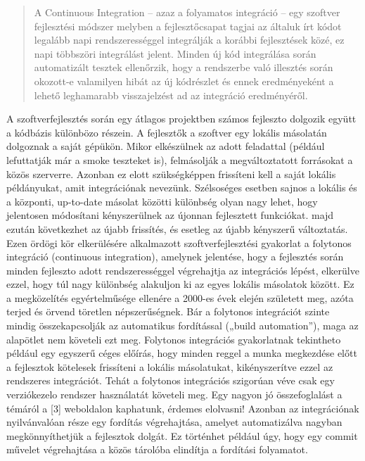\begin{quotation}
A Continuous Integration – azaz a folyamatos integráció – egy szoftver fejlesztési módszer melyben a fejlesztőcsapat tagjai az általuk írt kódot legalább napi rendszerességgel integrálják a korábbi fejlesztések közé, ez napi többszöri integrálást jelent. Minden új kód integrálása során automatizált tesztek ellenőrzik, hogy a rendszerbe való illesztés során okozott-e valamilyen hibát az új kódrészlet és ennek eredményeként a lehető leghamarabb visszajelzést ad az integráció eredményéről. \cite{martin_fowler_cont_int}
\end{quotation} 

A szoftverfejlesztés során egy átlagos projektben számos fejleszto dolgozik együtt a kódbázis különbözo részein. A fejlesztők a szoftver egy lokális másolatán dolgoznak a saját gépükön. Mikor elkészülnek az adott feladattal (például lefuttatják már a smoke teszteket is), felmásolják
a megváltoztatott forrásokat a közös szerverre. Azonban ez elott szükségképpen frissíteni kell a saját lokális példányukat, amit integrációnak nevezünk. Szélsoséges esetben sajnos a lokális és a központi, up-to-date másolat közötti különbség olyan nagy lehet, hogy jelentosen módosítani kényszerülnek az újonnan fejlesztett funkciókat. majd ezután következhet az újabb frissítés, és esetleg az újabb kényszerű változtatás. Ezen ördögi kör elkerülésére alkalmazott szoftverfejlesztési gyakorlat a folytonos integráció (continuous integration), amelynek jelentése, hogy a fejlesztés során minden fejleszto adott rendszerességgel végrehajtja az integrációs lépést, elkerülve ezzel, hogy túl nagy különbség alakuljon ki az egyes lokális másolatok között. Ez a megközelítés egyértelműsége ellenére a 2000-es évek elején született meg, azóta terjed és örvend töretlen népszerűségnek. Bár a folytonos integrációt szinte mindig összekapcsolják az automatikus fordítással („build automation”), maga az alapötlet nem követeli ezt meg. Folytonos integrációs gyakorlatnak tekintheto például egy egyszerű céges előírás, hogy minden reggel a munka megkezdése előtt a fejlesztok kötelesek frissíteni a lokális másolatukat, kikényszerítve ezzel az rendszeres integrációt. Tehát a folytonos integrációs szigorúan véve csak egy verziókezelo rendszer használatát követeli meg. Egy nagyon jó összefoglalást a témáról a [3] weboldalon kaphatunk, érdemes elolvasni!
Azonban az integrációnak nyilvánvalóan része egy fordítás végrehajtása, amelyet automatizálva nagyban megkönnyíthetjük a fejlesztok dolgát. Ez történhet például úgy, hogy egy commit művelet végrehajtása a közös tárolóba elindítja a fordítási folyamatot.
